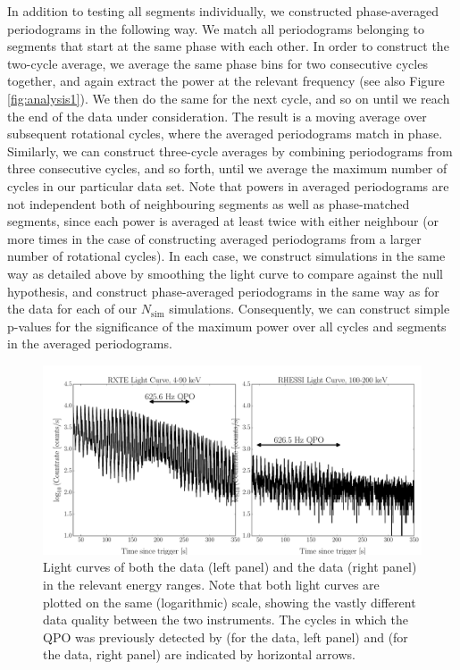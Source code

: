 \documentclass{emulateapj}
\begin{document}
In addition to testing all segments individually, we constructed phase-averaged periodograms in the following way. We match all periodograms belonging to segments that start at the same phase with each other. In order to construct the two-cycle average, we average the same phase bins for two consecutive cycles together, and again extract the power at the relevant frequency (see also Figure \ref{fig:analysis1}). We then do the same for the next cycle, and so on until we reach the end of the data under consideration. The result is a moving average over subsequent rotational cycles, where the averaged periodograms match in phase.
Similarly, we can construct three-cycle averages by combining periodograms from three consecutive cycles, and so forth, until we average the maximum number of cycles in our particular data set.  
Note that powers in averaged periodograms are not independent both of neighbouring segments as well as phase-matched segments, since each power is averaged at least twice with either neighbour (or more times in the case of constructing averaged periodograms from a larger number of rotational cycles). 
In each case, we construct simulations in the same way as detailed above by smoothing the light curve to compare against the null hypothesis, and construct phase-averaged periodograms in the same way as for the data for each of our $N_\mathrm{sim}$ simulations. Consequently, we can construct simple p-values for the significance of the maximum power over all cycles and segments in the averaged periodograms. 

\begin{figure}[htbp]
\begin{center}
\includegraphics[width=18cm]{f4.pdf}
\caption{Light curves of both the \rxte data (left panel) and the \rhessi data (right panel) in the relevant energy ranges. Note that both light curves are plotted on the same (logarithmic) scale, showing the vastly different data quality between the two instruments. 
The cycles in which the QPO was previously detected by \citet{Strohmayer06} (for the \rxte data, left panel) and \citet{Watts06} (for the \rhessi data, right panel) are indicated by horizontal arrows.}
\label{fig:lcs}
\end{center}
\end{figure}
\end{document}
